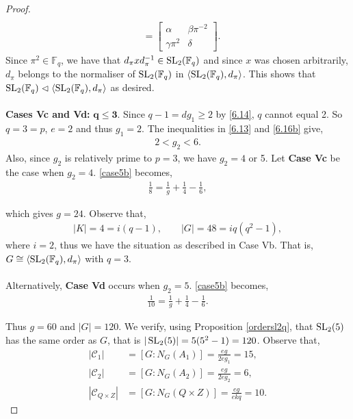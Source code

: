 \begin{proof}
\begin{align*}
\\[1.5ex] &= \begin{bmatrix} \alpha & \beta \pi^{-2} \\ \gamma \pi^{2} & \delta \end{bmatrix}. 
\end{align*}
Since $\pi^2 \in \mathbb{F}_q$, we have that $d_\pi x d_\pi^{-1} \in \operatorname{SL}_2(\mathbb{F}_q)$ and since $x$ was chosen arbitrarily, $d_\pi$ belongs to the normaliser of $\operatorname{SL}_2(\mathbb{F}_q)$ in $\langle \operatorname{SL}_2(\mathbb{F}_q), d_\pi \rangle$. This shows that $\operatorname{SL}_2(\mathbb{F}_q) \vartriangleleft \langle \operatorname{SL}_2(\mathbb{F}_q), d_\pi \rangle$ as desired. \\
\\
 \space \textbf{Cases Vc and Vd:} $\pmb{q \leq 3}$. Since $q - 1 = d g_1 \geq 2$ by \eqref{6.14}, $q$ cannot equal 2. So $q = 3 = p$, $e = 2$ and thus $g_1 = 2$. The inequalities in \eqref{6.13} and \eqref{6.16b} give,
\begin{align*} 2 < g_2 < 6.
\end{align*}
Also, since $g_2$ is relatively prime to $p=3$, we have $g_2 = 4$ or 5. Let \textbf{Case Vc} be the case when $g_2 = 4$. \eqref{case5b} becomes,
\begin{align*} \frac{1}{8} = \frac{1}{g} + \frac{1}{4} - \frac{1}{6},
\end{align*}

which gives $g = 24$. Observe that,
\begin{align*} |K| = 4 = i(q-1), \qquad |G| = 48 = iq(q^2-1),
\end{align*}
where $i=2$, thus we have the situation as described in Case Vb. That is, $G \cong \langle \operatorname{SL}_2(\mathbb{F}_q), d_\pi \rangle$ with $q=3$.\\
\\
Alternatively, \textbf{Case Vd} occurs when $g_2 = 5$. \eqref{case5b} becomes,
\begin{align*} \frac{1}{10} = \frac{1}{g} + \frac{1}{4} - \frac{1}{6}.
\end{align*}

Thus $g = 60 $ and $|G| = 120$. We verify, using Proposition \ref{ordersl2q}, that $\operatorname{SL}_2(5)$ has the same order as $G$, that is $|\operatorname{SL}_2(5)| = 5(5^2-1) =120$. Observe that,
\begin{align*} |\mathcal{C}_1| &= [G : N_G(A_1)] = \frac{eg}{2eg_1} = 15,
\\[1ex] |\mathcal{C}_2| &= [G : N_G(A_2)] = \frac{eg}{2eg_2} = 6,
\\[1ex] |\mathcal{C}_{Q \times Z}| &= [G : N_G(Q \times Z)] = \frac{eg}{ekq} = 10.
\end{align*}


\end{proof}
